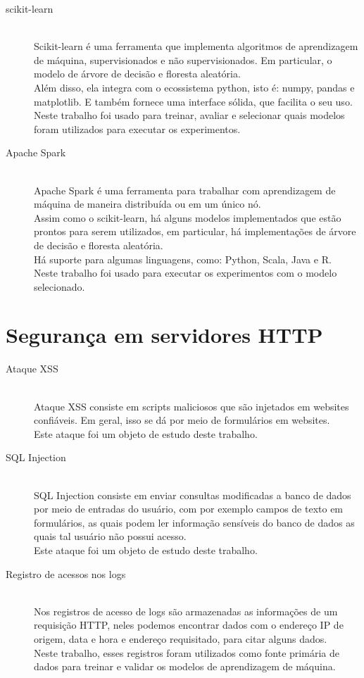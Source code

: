 \begin{description}
    \item[scikit-learn] \hfill \\ Scikit-learn é uma ferramenta que implementa algoritmos de aprendizagem
    de máquina, supervisionados e não supervisionados. Em particular, o modelo de árvore de decisão e floresta
    aleatória.\\ 
    Além disso, ela integra com o ecossistema python, isto é: numpy, pandas e matplotlib. E também 
    fornece uma interface sólida, que facilita o seu uso.  \\
    Neste trabalho foi usado para treinar, avaliar e selecionar quais modelos foram utilizados 
    para executar os experimentos.

    \item[Apache Spark] \hfill \\ Apache Spark é uma ferramenta para trabalhar com aprendizagem 
    de máquina de maneira distribuída ou em um único nó. \\
    Assim como o scikit-learn, há alguns modelos implementados que estão prontos para serem utilizados, 
    em particular, há implementações de árvore de decisão e floresta aleatória. \\
    Há suporte para algumas linguagens, como: Python, Scala, Java e R. \\
    Neste trabalho foi usado para executar os experimentos com o modelo selecionado.
\end{description}

\section{Segurança em servidores HTTP}

\begin{description}
    \item[Ataque XSS] \hfill \\ Ataque XSS consiste em scripts maliciosos que são injetados em 
    websites confiáveis. Em geral, isso se dá por meio de formulários em websites. \\ 
    Este ataque foi um objeto de estudo deste trabalho.
    \item[SQL Injection] \hfill \\ SQL Injection consiste em enviar consultas modificadas a banco 
    de dados por meio de entradas do usuário, com por exemplo campos de texto em formulários, as quais 
    podem ler informação sensíveis do banco de dados as quais tal usuário não possui acesso. \\
    Este ataque foi um objeto de estudo deste trabalho.
    \item[Registro de acessos nos logs] \hfill \\ Nos registros de acesso de logs são armazenadas as
    informações de um requisição HTTP, neles podemos encontrar dados com o endereço IP de origem,
    data e hora e endereço requisitado, para citar alguns dados.  \\
    Neste trabalho, esses registros foram utilizados como fonte primária de dados para treinar 
    e validar os modelos de aprendizagem de máquina.
\end{description}

